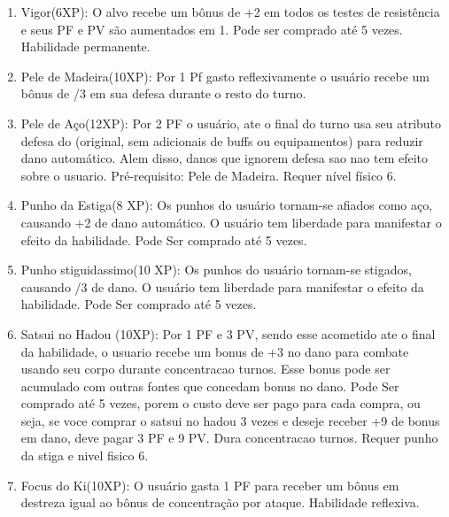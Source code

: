 \begin{enumerate}

		\item Vigor(6XP): O alvo recebe um bônus de +2 em todos os testes de resistência e seus PF e PV são aumentados em 1. Pode ser comprado até 5 vezes. Habilidade permanente.
  
  	\item Pele de Madeira(10XP): Por 1 Pf gasto reflexivamente o usuário recebe um bônus de /3 em sua defesa durante o resto do turno. 
  	
  	\item Pele de Aço(12XP): Por 2 PF o usuário, ate o final do turno usa seu atributo defesa do (original, sem adicionais de buffs ou equipamentos) para reduzir dano automático. Alem disso, danos que ignorem defesa sao nao tem efeito sobre o usuario. Pré-requisito: Pele de Madeira. Requer nível físico 6.

  
  	\item Punho da Estiga(8 XP): Os punhos do usuário tornam-se afiados como aço, causando +2 de dano automático. O usuário tem liberdade para manifestar o efeito da habilidade. Pode Ser comprado até 5 vezes.

  	\item Punho stiguidassimo(10 XP): Os punhos do usuário tornam-se stigados, causando /3 de dano. O usuário tem liberdade para manifestar o efeito da habilidade. Pode Ser comprado até 5 vezes.

  	\item Satsui no Hadou (10XP): Por 1 PF e 3 PV, sendo esse acometido ate o final da habilidade, o usuario recebe um bonus de +3 no dano para combate usando seu corpo durante concentracao turnos. Esse bonus pode ser acumulado com outras fontes que concedam bonus no dano. Pode Ser comprado até 5 vezes, porem o custo deve ser pago para cada compra, ou seja, se voce comprar o satsui no hadou 3 vezes e deseje receber +9 de bonus em dano, deve pagar 3 PF e 9 PV. Dura concentracao turnos. Requer punho da stiga e nivel fisico 6.

  	\item Focus do Ki(10XP): O usuário gasta 1 PF para receber um bônus em destreza igual ao bônus de concentração por ataque. Habilidade reflexiva.


\end{enumerate}
